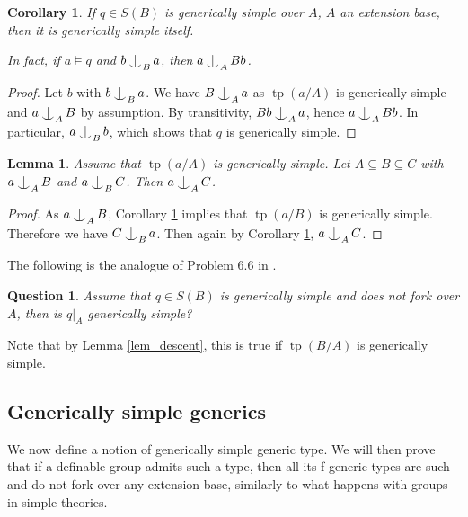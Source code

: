 \documentclass{amsart}
\makeatletter
\numberwithin{equation}{section}
\newtheorem{cor}[thm]{Corollary}
\newtheorem{lemme}[thm]{Lemma}
\newtheorem{question}[thm]{Question}
\theoremstyle{definition}
\theoremstyle{mystyle}
\theoremstyle{remark}
\DeclareMathOperator{\tp}{tp}
\def\indsym#1#2{%
 \setbox0=\hbox{$\m@th#1x$}%
 \kern\wd0%
 \hbox to 0pt{\hss$\m@th#1\mid$\hbox to 0pt{$\m@th#1^{#2}$\hss}\hss}%
 \lower.9\ht0\hbox to 0pt{\hss$\m@th#1\smile$\hss}%
 \kern\wd0}
\newcommand{\ind}[1][]{\mathop{\mathpalette\indsym{#1}}}
\makeatother
\begin{document}
\begin{cor}\label{cor_gensimple}
If $q\in S(B)$ is generically simple over $A$, $A$ an extension base, then it is generically simple itself.

In fact, if $a\models q$ and $b \ind_B a$, then $a \ind_A Bb$.
\end{cor}
\begin{proof}
Let $b$ with $b \ind_B a$. We have $B\ind_A a$ as $\tp(a/A)$ is generically simple and $a\ind_A B$ by assumption. By transitivity, $Bb \ind_A a$, hence $a\ind_A Bb$. In particular, $a\ind_B b$, which shows that $q$ is generically simple.
\end{proof}

\begin{lemme}\label{lem_trans}
Assume that $\tp(a/A)$ is generically simple. Let $A\subseteq B\subseteq C$ with $a\ind_A B$ and $a\ind_B C$. Then $a\ind_A C$.
\end{lemme}
\begin{proof}
As $a\ind_A B$, Corollary \ref{cor_gensimple} implies that $\tp(a/B)$ is generically simple. Therefore we have $C\ind_B a$. Then again by Corollary \ref{cor_gensimple}, $a\ind_A C$.
\end{proof}

The following is the analogue of Problem 6.6 in \cite{CherNTP}.

\begin{question}
Assume that $q\in S(B)$ is generically simple and does not fork over $A$, then is $q|_A$ generically simple?
\end{question}

Note that by Lemma \ref{lem_descent}, this is true if $\tp(B/A)$ is generically simple.

\subsection{Generically simple generics}

We now define a notion of generically simple generic type. We will then prove that if a definable group admits such a type, then all its f-generic types are such and do not fork over any extension base, similarly to what happens with groups in simple theories.
\end{document}

